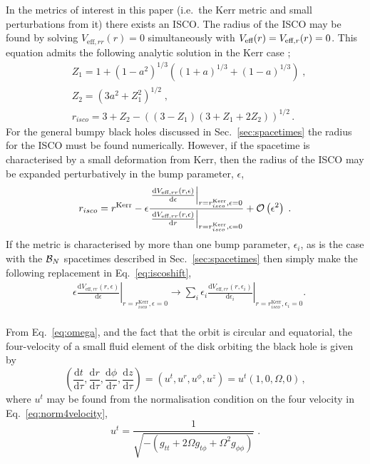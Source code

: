 In the metrics of interest in this paper (i.e.\ the Kerr metric and small perturbations from it) there exists an ISCO. The radius of the ISCO may be found by solving $V_{\textrm{eff}, r r}(r)=0$ simultaneously with $V_{\textrm{eff}}(r)\nobreak=\nobreak V_{\textrm{eff},r}(r)\nobreak=\nobreak0$. This equation admits the following analytic solution in the Kerr case \citep{1972ApJ...178..347B};
\begin{eqnarray}\label{eq:KerrISCO}
&Z_{1}=1+\left(1-a^{2}\right)^{1/3}\left((1+a)^{1/3}+(1-a)^{1/3}\right) \; ,\nonumber\\
&Z_{2}=\left(3a^{2}+Z_{1}^{2}\right)^{1/2} \; , \nonumber\\
&r_{isco}= 3+Z_{2}-\left((3-Z_{1})(3+Z_{1}+2Z_{2})\right)^{1/2}\, .
\end{eqnarray}
For the general bumpy black holes discussed in Sec.\ \ref{sec:spacetimes} the radius for the ISCO must be found numerically. However, if the spacetime is characterised by a small deformation from Kerr, then the radius of the ISCO may be expanded perturbatively in the bump parameter, $\epsilon$,
\begin{equation}\label{eq:iscoshift} r_{isco}=r^{\textrm{Kerr}}-\epsilon \frac{ \left.\frac{\textrm{d}V_{\textrm{eff},rr}(r,\epsilon)}{\textrm{d}\epsilon}\right|_{r=r^{\textrm{Kerr}}_{isco},\epsilon=0} }{\left.\frac{\textrm{d}V_{\textrm{eff},rr}(r,\epsilon)}{\textrm{d}r}\right|_{r=r^{\textrm{Kerr}}_{isco},\epsilon=0}} +{\cal{O}}\left(\epsilon^{2}\right)\; .\end{equation}
If the metric is characterised by more than one bump parameter, $\epsilon_{i}$, as is the case with the ${\cal{B}}_{N}$ spacetimes described in Sec.\ \ref{sec:spacetimes} then simply make the following replacement in Eq.\ \ref{eq:iscoshift},
\begin{eqnarray} &\epsilon\left.\frac{\textrm{d}V_{\textrm{eff},rr}(r,\epsilon)}{\textrm{d}\epsilon}\right|_{r=r_{isco}^{\textrm{Kerr}},\epsilon=0} \rightarrow\sum_{i}\epsilon_{i}\left.\frac{\textrm{d}V_{\textrm{eff},rr}(r,\epsilon_{i})}{\textrm{d}\epsilon_{i}}\right|_{r=r^{\textrm{Kerr}}_{isco},\epsilon_{i}=0} .\nonumber\\
&\end{eqnarray}

From Eq.\ \ref{eq:omega}, and the fact that the orbit is circular and equatorial, the four-velocity of a small fluid element of the disk orbiting the black hole is given by
\begin{equation}\label{eq:circorbfourvel} \left( \frac{\textrm{d}t}{\textrm{d}\tau} , \frac{\textrm{d}r}{\textrm{d}\tau} , \frac{\textrm{d}\phi}{\textrm{d}\tau} , \frac{\textrm{d}z}{\textrm{d}\tau} \right) = \left(u^{t} , u^{r} , u^{\phi} , u^{z} \right) = u^{t} \left( 1,0,\Omega , 0 \right) \, ,\end{equation}
where $u^{t}$ may be found from the normalisation condition on the four velocity in Eq.\ \ref{eq:norm4velocity},
\begin{equation}\label{eq:four:vel} u^{t} = \frac{1}{\sqrt{-\left( g_{tt}+2\Omega g_{t\phi} +\Omega^{2}g_{\phi\phi} \right)}} \; .\end{equation}


